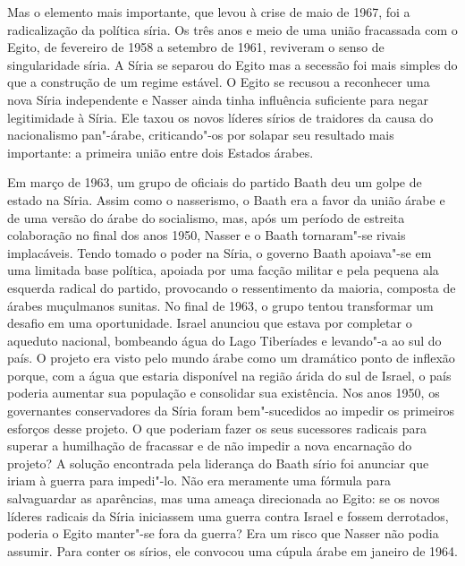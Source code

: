 Mas o elemento mais importante, que levou à crise de maio de 1967, foi a
radicalização da política síria. Os três anos e meio de uma união
fracassada com o Egito, de fevereiro de 1958 a setembro de 1961,
reviveram o senso de singularidade síria. A Síria se separou do Egito
mas a secessão foi mais simples do que a construção de um regime estável. O
Egito se recusou a reconhecer uma nova Síria independente e Nasser ainda
tinha influência suficiente para negar legitimidade à Síria. Ele taxou
os novos líderes sírios de traidores da causa do nacionalismo
pan"-árabe, criticando"-os por solapar seu resultado mais importante: a
primeira união entre dois Estados árabes.

Em março de 1963, um grupo de oficiais do partido Baath deu um golpe de
estado na Síria. Assim como o
nasserismo, o Baath era a favor da união árabe e de uma versão do
árabe do socialismo, mas, após um período de estreita colaboração no final
dos anos 1950, Nasser e o Baath tornaram"-se rivais implacáveis. Tendo
tomado o poder na Síria, o governo Baath apoiava"-se em uma limitada
base política, apoiada por uma facção militar e pela pequena ala esquerda
radical do partido, provocando o ressentimento da maioria, composta de árabes
muçulmanos sunitas. No final de 1963, o grupo tentou transformar um
desafio em uma oportunidade. Israel anunciou que estava por completar o
aqueduto nacional, bombeando água do Lago Tiberíades e levando"-a ao sul
do país. O projeto era visto pelo mundo árabe como um dramático ponto de
inflexão porque, com a água que estaria disponível na região árida do
sul de Israel, o país poderia aumentar sua população e consolidar sua
existência. Nos anos 1950, os governantes conservadores da Síria foram
bem"-sucedidos ao impedir os primeiros esforços desse projeto. O que
poderiam fazer os seus sucessores radicais para superar a humilhação de
fracassar e de não impedir a nova encarnação do projeto? A solução
encontrada pela liderança do Baath sírio foi anunciar que iriam à
guerra para impedi"-lo. Não era meramente uma fórmula para salvaguardar as
aparências, mas uma ameaça direcionada ao Egito: se os novos líderes
radicais da Síria iniciassem uma guerra contra Israel e fossem
derrotados, poderia o Egito manter"-se fora da guerra? Era um risco que
Nasser não podia assumir. Para conter os sírios, ele convocou uma cúpula
árabe em janeiro de 1964.

